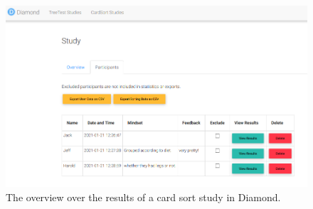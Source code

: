 \begin{figure}[tp]  \centering
\includegraphics[keepaspectratio,width=\linewidth,height=\halfh]{images/implementation/results.png}
\caption[Card Sorting Results Overview] 
{The overview over the results of a card sort study in Diamond.
 } 
\label{fig:results} 
\end{figure}

